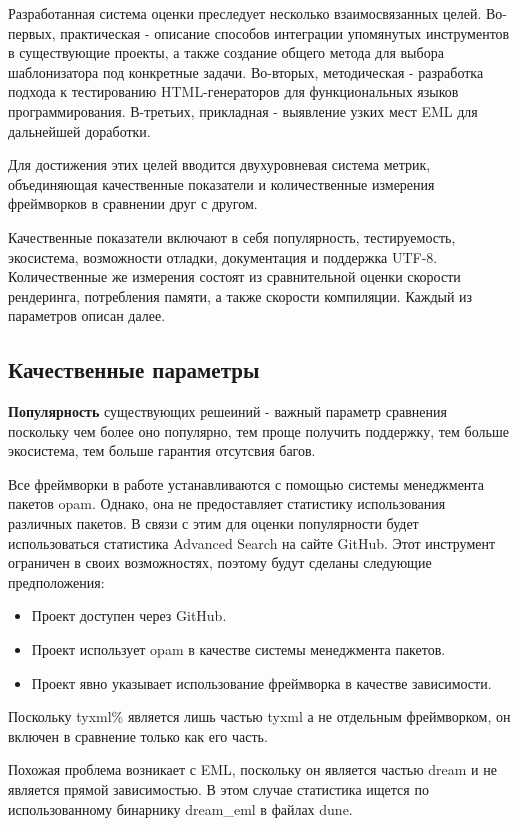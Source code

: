 Разработанная система оценки преследует несколько взаимосвязанных целей.
Во-первых, практическая - описание способов интеграции упомянутых инструментов в существующие проекты, а также создание общего метода для выбора шаблонизатора под конкретные задачи.
Во-вторых, методическая - разработка подхода к тестированию HTML-генераторов для функциональных языков программирования.
В-третьих, прикладная - выявление узких мест EML для дальнейшей доработки.

Для достижения этих целей вводится двухуровневая система метрик, объединяющая качественные показатели и количественные измерения фреймворков в сравнении друг с другом.

Качественные показатели включают в себя популярность, тестируемость, экосистема, возможности отладки, документация и поддержка UTF-8.
Количественные же измерения состоят из сравнительной оценки скорости рендеринга, потребления памяти, а также скорости компиляции.
Каждый из параметров описан далее.

\subsection{Качественные параметры}

\textbf{Популярность} существующих решеиний - важный параметр сравнения поскольку чем более оно популярно, тем проще получить поддержку, тем больше экосистема, тем больше гарантия отсутсвия багов.

Все фреймворки в работе устанавливаются с помощью системы менеджмента пакетов opam.
Однако, она не предоставляет статистику использования различных пакетов.
В связи с этим для оценки популярности будет использоваться статистика Advanced Search на сайте GitHub.
Этот инструмент ограничен в своих возможностях, поэтому будут сделаны следующие предположения:
\begin{itemize}
    \item Проект доступен через GitHub.
    \item Проект использует opam в качестве системы менеджмента пакетов.
    \item Проект явно указывает использование фреймворка в качестве зависимости.
\end{itemize}

Поскольку tyxml\% является лишь частью tyxml а не отдельным фреймворком, он включен в сравнение только как его часть.

Похожая проблема возникает с EML, поскольку он является частью dream и не является прямой зависимостью.
В этом случае статистика ищется по использованному бинарнику dream\_eml в файлах dune.


